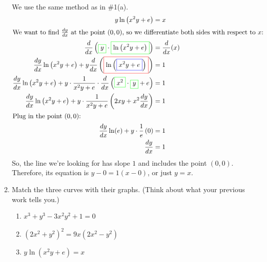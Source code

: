 \documentclass{article}
\begin{document}
\begin{enumerate}
    \begin{solution} 
      We use the same method as in {{{{\#1}}(a)}}.
      \begin{align*}
        y \ln \left(x^2 y+ e \right) &= x \\
        \intertext{We want to find $\frac{dy}{dx}$ at the point $(0, 0)$,
          so we differentiate both sides with respect to $x$:}
        \frac{d}{dx} \left(\fcolorbox{green}{white}{$\displaystyle
            y$}\cdot \fcolorbox{green}{white}{$\displaystyle \ln\left(x^ {
                2} y+
              e\right)$}\right) &= \frac{d}{dx} (x) \\
        \frac{dy}{dx} \ln \left(x^2 y+ e \right) + y \frac{d}{dx}
        \left(\fcolorbox{red}{white}{$\displaystyle
            \ln\left(\fcolorbox{blue}{white}{$\displaystyle x^ { 2}
                y+ e$}\right)$}\right) &= 1 \\
        \frac{dy}{dx} \ln \left(x^2 y+ e \right) + y \cdot \frac{1}{x^2 y
          + e} \cdot \frac{d}{dx}
        \left(\fcolorbox{green}{white}{$\displaystyle x^ { 2} $}\cdot
          \fcolorbox{green}{white}{$\displaystyle  y$} + e \right) &= 1 \\
        \frac{dy}{dx} \ln \left(x^2 y+ e \right) + y \cdot \frac{1}{x^2 y
          + e} \left( 2x y + x^2 \frac{dy}{dx} \right) &= 1 \\
        \shortintertext{Plug in the point $(0, 0)$:} %
        \frac{dy}{dx} \ln (e) + y \cdot \frac{1}{e} \left( 0 \right) &= 1
        \\
        \frac{dy}{dx} &= 1
      \end{align*}
      So, the line we're looking for has slope $1$ and includes the point
      $(0, 0)$.  Therefore, its equation is $y - 0 = 1 (x - 0)$, or just
      $\boxed{y = x}$.
    \end{solution}

  \item
\begin{problem}
      Match the three curves with their graphs.  (Think about what your previous work tells you.)

        \begin{multicols}{2}
        \begin{enumerate}[topsep=0pt, label=(\arabic*)]
        \item $x^3+y^3-3x^2 y^2 +1=0$

        \item $(2x^2 + y^2)^2 = 9x (2x^2 - y^2)$

        \item $y \ln \left(x^2 y+ e \right) = x$


\end{enumerate}
\end{multicols}
\end{problem}
\end{enumerate}
\end{document}
